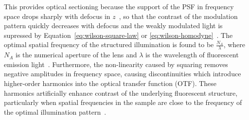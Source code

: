 This provides optical sectioning because the support of the PSF in frequency space drops sharply with defocus in $z$~\cite{karadaglic2008image, thomas2013optical}, so that the contrast of the modulation pattern quickly decreases with defocus and the weakly modulated light is supressed by Equation~\ref{eq:wilson-square-law} or \ref{eq:wilson-homodyne}~\cite{dan2014structured}.
The optimal spatial frequency of the structured illumination is found to be $\frac{N_A}{\lambda}$, where $N_A$ is the numerical aperture of the lens and $\lambda$ is the wavelength of fluorescent emission light~\cite{karadaglic2008image, shaw2015high}. 
Furthermore, the non-linearity caused by squaring removes negative amplitudes in frequency space, causing discontinuities which introduce higher-order harmonics into the optical transfer function (OTF).
These harmonics artificially enhance contrast of the underlying fluorescent structure, particularly when spatial frequencies in the sample are close to the frequency of the optimal illumination pattern~\cite{shaw2015high}. 

